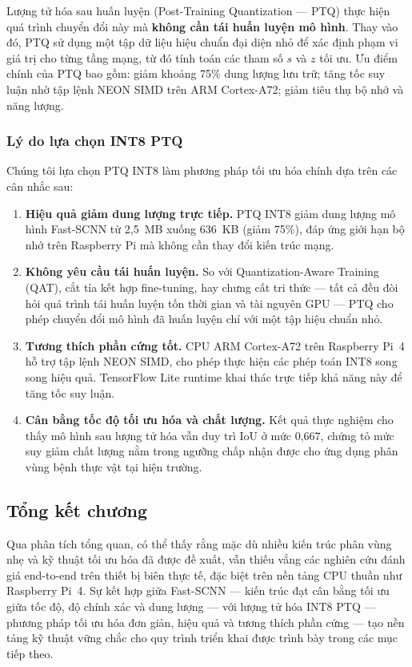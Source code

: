 \documentclass[conference]{IEEEtran}
\begin{document}
Lượng tử hóa sau huấn luyện (Post-Training Quantization --- PTQ) thực hiện quá trình chuyển đổi này mà \textbf{không cần tái huấn luyện mô hình}. Thay vào đó, PTQ sử dụng một tập dữ liệu hiệu chuẩn đại diện nhỏ để xác định phạm vi giá trị cho từng tầng mạng, từ đó tính toán các tham số $s$ và $z$ tối ưu. Ưu điểm chính của PTQ bao gồm: giảm khoảng 75\% dung lượng lưu trữ; tăng tốc suy luận nhờ tập lệnh NEON SIMD trên ARM Cortex-A72; giảm tiêu thụ bộ nhớ và năng lượng.

\subsubsection{Lý do lựa chọn INT8 PTQ}

Chúng tôi lựa chọn PTQ INT8 làm phương pháp tối ưu hóa chính dựa trên các cân nhắc sau:
\begin{enumerate}
  \item \textbf{Hiệu quả giảm dung lượng trực tiếp.} PTQ INT8 giảm dung lượng mô hình Fast-SCNN từ 2,5~MB xuống 636~KB (giảm 75\%), đáp ứng giới hạn bộ nhớ trên Raspberry Pi mà không cần thay đổi kiến trúc mạng.
  \item \textbf{Không yêu cầu tái huấn luyện.} So với Quantization-Aware Training (QAT), cắt tỉa kết hợp fine-tuning, hay chưng cất tri thức --- tất cả đều đòi hỏi quá trình tái huấn luyện tốn thời gian và tài nguyên GPU --- PTQ cho phép chuyển đổi mô hình đã huấn luyện chỉ với một tập hiệu chuẩn nhỏ.
  \item \textbf{Tương thích phần cứng tốt.} CPU ARM Cortex-A72 trên Raspberry Pi~4 hỗ trợ tập lệnh NEON SIMD, cho phép thực hiện các phép toán INT8 song song hiệu quả. TensorFlow Lite runtime khai thác trực tiếp khả năng này để tăng tốc suy luận.
  \item \textbf{Cân bằng tốc độ tối ưu hóa và chất lượng.} Kết quả thực nghiệm cho thấy mô hình sau lượng tử hóa vẫn duy trì IoU ở mức 0,667, chứng tỏ mức suy giảm chất lượng nằm trong ngưỡng chấp nhận được cho ứng dụng phân vùng bệnh thực vật tại hiện trường.
\end{enumerate}

\subsection{Tổng kết chương}

Qua phân tích tổng quan, có thể thấy rằng mặc dù nhiều kiến trúc phân vùng nhẹ và kỹ thuật tối ưu hóa đã được đề xuất, vẫn thiếu vắng các nghiên cứu đánh giá end-to-end trên thiết bị biên thực tế, đặc biệt trên nền tảng CPU thuần như Raspberry Pi~4. Sự kết hợp giữa Fast-SCNN --- kiến trúc đạt cân bằng tối ưu giữa tốc độ, độ chính xác và dung lượng --- với lượng tử hóa INT8 PTQ --- phương pháp tối ưu hóa đơn giản, hiệu quả và tương thích phần cứng --- tạo nền tảng kỹ thuật vững chắc cho quy trình triển khai được trình bày trong các mục tiếp theo.
\end{document}
